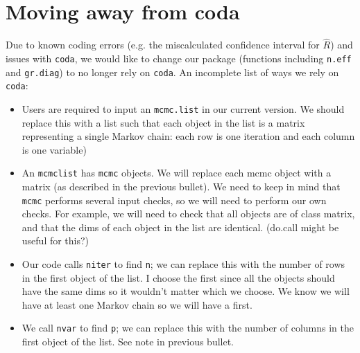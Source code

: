 \documentclass[12pt]{article}
\theoremstyle{remark}
\begin{document}
\section{\textbf{Moving away from coda}}

Due to known coding errors (e.g. the miscalculated confidence interval for $\hat{R}$) and issues with \texttt{coda}, we would like to change our package (functions including \texttt{n.eff} and \texttt{gr.diag}) to no longer rely on \texttt{coda}. An incomplete list of ways we rely on  \texttt{coda}: 

\begin{itemize}
 \renewcommand{\labelitemi}{$\square$}
\item Users are required to input an \texttt{mcmc.list} in our current version. We should replace this with a list such that each object in the list is a matrix representing a single Markov chain: each row is one iteration and each column is one variable)
\item An \texttt{mcmclist} has \texttt{mcmc} objects. We will replace each mcmc object with a matrix (as described in the previous bullet). We need to keep in mind that \texttt{mcmc} performs several input checks, so we will need to perform our own checks. For example, we will need to check that all objects are of class matrix, and that the dims of each object in the list are identical. (do.call might be useful for this?)

\item Our code calls \texttt{niter} to find \texttt{n}; we can replace this with the number of rows in the first object of the list. I choose the first since all the objects should have the same dims so it wouldn't matter which we choose. We know we will have at least one Markov chain so we will have a first.
\item We call \texttt{nvar} to find \texttt{p}; we can replace this with the number of columns in the first object of the list. See note in previous bullet.
\end{itemize}










\end{document}
